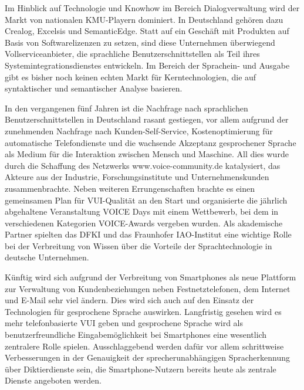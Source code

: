 \documentclass[]{../../metanetpaper}
\begin{document}
\begin{Parallel}[c]{79mm}{78mm}
{Im Hinblick auf Technologie und Knowhow im Bereich Dialogverwaltung wird der Markt von nationalen KMU-Playern dominiert. In Deutschland gehören dazu Crealog, Excelsis und SemanticEdge. Statt auf ein Geschäft mit Produkten auf Basis von Softwarelizenzen zu setzen, sind diese Unternehmen überwiegend Vollserviceanbieter, die sprachliche Benutzerschnittstellen als Teil ihres Systemintegrationsdienstes entwickeln. Im Bereich der Sprachein- und Ausgabe gibt es bisher noch keinen echten Markt für Kerntechnologien, die auf syntaktischer und semantischer Analyse basieren.

In den vergangenen fünf Jahren ist die Nachfrage nach sprachlichen Benutzerschnittstellen in Deutschland rasant gestiegen, vor allem aufgrund der zunehmenden Nachfrage nach Kunden-Self-Service, Kostenoptimierung für automatische Telefondienste und die wachsende Akzeptanz gesprochener Sprache als Medium für die Interaktion zwischen Mensch und Maschine. All dies wurde durch die Schaffung des Netzwerks www.voice-community.de katalysiert, das Akteure aus der Industrie, Forschungsinstitute und Unternehmenskunden zusammenbrachte. Neben weiteren Errungenschaften brachte es einen gemeinsamen Plan für VUI-Qualität an den Start und organisierte die jährlich abgehaltene Veranstaltung VOICE Days mit einem Wettbewerb, bei dem in verschiedenen Kategorien VOICE-Awards vergeben wurden. Als akademische Partner spielten das DFKI und das Fraunhofer IAO-Institut eine wichtige Rolle bei der Verbreitung von Wissen über die Vorteile der Sprachtechnologie in deutsche Unternehmen.

Künftig wird sich aufgrund der Verbreitung von Smartphones als neue Plattform zur Verwaltung von Kundenbeziehungen neben Festnetztelefonen, dem Internet und E-Mail sehr viel ändern. Dies wird sich auch auf den Einsatz der Technologien für gesprochene Sprache auswirken. Langfristig gesehen wird es mehr telefonbasierte VUI geben und gesprochene Sprache wird als benutzerfreundliche Eingabemöglichkeit bei Smartphones eine wesentlich zentralere Rolle spielen. Ausschlaggebend werden dafür vor allem schrittweise Verbesserungen in der Genauigkeit der sprecherunabhängigen Spracherkennung über Diktierdienste sein, die Smartphone-Nutzern bereits heute als zentrale Dienste angeboten werden.}

\end{Parallel}
\end{document}

